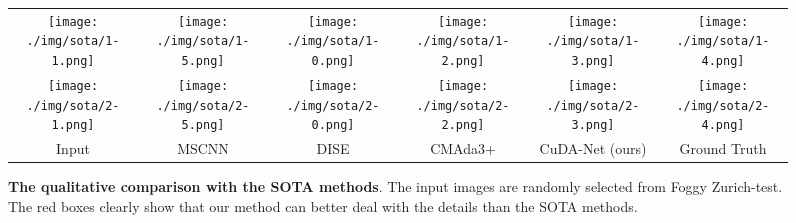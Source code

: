 \documentclass[10pt,twocolumn,letterpaper]{article}
\begin{document}
\begin{table}[t]
\begin{center}
\renewcommand\tabcolsep{1pt}
\caption{\textbf{Training data comparison with CMAda3+.} Both our CuDA-Net and CuDA-Net+ outperform CMAda3+, using less synthetic foggy data and less real foggy data. `light', `medium' and `dense' in the table indicates the different fog density.}
\label{tab:images_to_use}
\vspace{-3mm}
\vspace{-8mm}
\end{center}
\end{table}

\begin{figure*}[t]
\centering
		\tabcolsep=0.5pt
		\renewcommand\arraystretch{0.5}
		\begin{tabular}{cccccc}
			\texttt{[image: ./img/sota/1-1.png]} &
			\texttt{[image: ./img/sota/1-5.png]} &
			\texttt{[image: ./img/sota/1-0.png]} &
			\texttt{[image: ./img/sota/1-2.png]} &
			\texttt{[image: ./img/sota/1-3.png]} &
			\texttt{[image: ./img/sota/1-4.png]} \\
			\texttt{[image: ./img/sota/2-1.png]} &
			\texttt{[image: ./img/sota/2-5.png]} &
			\texttt{[image: ./img/sota/2-0.png]} &
			\texttt{[image: ./img/sota/2-2.png]} &
			\texttt{[image: ./img/sota/2-3.png]} &
			\texttt{[image: ./img/sota/2-4.png]} \\
			Input  & MSCNN & DISE & CMAda3+ & CuDA-Net (ours) & Ground Truth   \\
	\end{tabular}
	\vspace{-2mm}
\caption{\label{fig:sota} \textbf{The qualitative comparison with the SOTA methods}. The input images are randomly selected from Foggy Zurich-test. The red boxes clearly show that our method can better deal with the details than the SOTA methods.} 
\vspace{-2mm}
\end{figure*}
\end{document}
